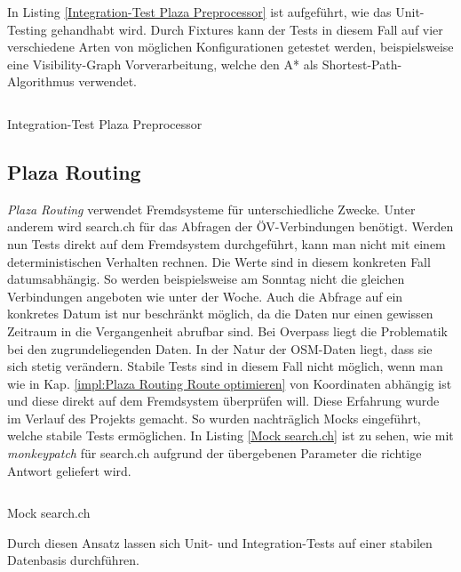 In Listing \ref{Integration-Test Plaza Preprocessor} ist aufgeführt, wie das Unit-Testing gehandhabt wird. Durch Fixtures kann der Tests in diesem Fall auf vier verschiedene Arten von möglichen Konfigurationen getestet werden, beispielsweise eine Visibility-Graph Vorverarbeitung, welche den A* \cite{astar} als Shortest-Path-Algorithmus verwendet.

\begin{listing}[ht]
    \inputminted{python}{projectdoc/listing/test_plaza_prepreprocessor.py}
    \caption{Integration-Test Plaza Preprocessor}
    \label{Integration-Test Plaza Preprocessor}
\end{listing}

\subsection{Plaza Routing}
\label{test:Plaza Routing}

\emph{Plaza Routing} verwendet Fremdsysteme für unterschiedliche Zwecke. Unter anderem wird search.ch \cite{search_ch_route_api} für das Abfragen der ÖV-Verbindungen benötigt. Werden nun Tests direkt auf dem Fremdsystem durchgeführt, kann man nicht mit einem deterministischen Verhalten rechnen. Die Werte sind in diesem konkreten Fall datumsabhängig. So werden beispielsweise am Sonntag nicht die gleichen Verbindungen angeboten wie unter der Woche. Auch die Abfrage auf ein konkretes Datum ist nur beschränkt möglich, da die Daten nur einen gewissen Zeitraum in die Vergangenheit abrufbar sind. Bei Overpass \cite{wiki:overpass} liegt die Problematik bei den zugrundeliegenden Daten. In der Natur der \ac{OSM}-Daten liegt, dass sie sich stetig verändern. Stabile Tests sind in diesem Fall nicht möglich, wenn man wie in Kap. \ref{impl:Plaza Routing Route optimieren} von Koordinaten abhängig ist und diese direkt auf dem Fremdsystem überprüfen will. Diese Erfahrung wurde im Verlauf des Projekts gemacht. So wurden nachträglich Mocks eingeführt, welche stabile Tests ermöglichen. In Listing \ref{Mock search.ch} ist zu sehen, wie mit \emph{monkeypatch} \cite{pytest} für search.ch \cite{search_ch_route_api} aufgrund der übergebenen Parameter die richtige Antwort geliefert wird. 

\begin{listing}[ht]
    \inputminted{python}{projectdoc/listing/mock_search_ch.py}
    \caption{Mock search.ch}
    \label{Mock search.ch}
\end{listing}

Durch diesen Ansatz lassen sich Unit- und Integration-Tests auf einer stabilen Datenbasis durchführen.

